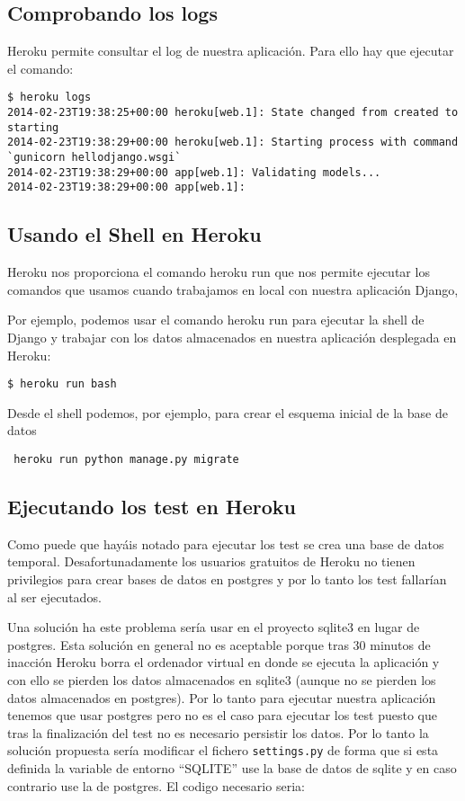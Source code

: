 \documentclass[12pt]{article} %
\begin{document}
\subsection{Comprobando los logs}

 Heroku permite consultar el log de nuestra aplicación. Para ello hay que ejecutar el comando:
 
\begin{verbatim}
$ heroku logs
2014-02-23T19:38:25+00:00 heroku[web.1]: State changed from created to starting
2014-02-23T19:38:29+00:00 heroku[web.1]: Starting process with command `gunicorn hellodjango.wsgi`
2014-02-23T19:38:29+00:00 app[web.1]: Validating models...
2014-02-23T19:38:29+00:00 app[web.1]:
\end{verbatim}


\subsection{Usando el Shell en Heroku}
\label{subsec:shellHeroku}
Heroku nos proporciona el comando heroku run que nos permite ejecutar los comandos que usamos cuando trabajamos en local con nuestra aplicación Django, 

Por ejemplo, podemos usar el comando heroku run para ejecutar la shell de Django y trabajar con los datos almacenados en nuestra aplicación desplegada en Heroku:

\begin{verbatim}
$ heroku run bash 

\end{verbatim}

Desde el  shell podemos, por ejemplo, para crear el esquema inicial de la base de datos

\begin{verbatim}
 heroku run python manage.py migrate
\end{verbatim}

\subsection{Ejecutando los test en Heroku}
Como puede que hayáis  notado para ejecutar los test se crea una base de datos temporal. Desafortunadamente los usuarios gratuitos de Heroku no tienen privilegios para crear bases de datos
en postgres y por lo tanto los test fallarían al ser ejecutados.

Una solución ha este problema sería usar en el proyecto sqlite3 en lugar de postgres. Esta solución en general no es aceptable porque tras 30 minutos de inacción Heroku borra el ordenador virtual en donde se ejecuta la aplicación y con ello se pierden los datos almacenados en sqlite3 (aunque no se pierden los datos almacenados en postgres). Por lo tanto para ejecutar nuestra aplicación tenemos que usar postgres pero no es el caso para ejecutar los test puesto que tras la finalización del test no es necesario persistir los datos. Por lo tanto la solución propuesta sería modificar el fichero
\texttt{settings.py} de forma que si esta definida la variable de entorno ``SQLITE'' use la base de datos de sqlite y en caso contrario use la de postgres. El codigo necesario seria:
\end{document}
